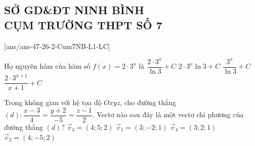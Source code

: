 \subsection*{SỞ GD\&ĐT NINH BÌNH\\CỤM TRƯỜNG THPT SỐ 7}

\caulc
{}[ans/ans-47-26-2-Cum7NB-L1-LC]
\begin{ex}%
	Họ nguyên hàm của hàm số $f(x)=2 \cdot 3^x$ là
	\choice
	{\True $\dfrac{2 \cdot 3^x}{\ln 3}+C$}
	{$2 \cdot 3^x \ln 3+C$}
	{$\dfrac{3^x}{\ln 3}+C$}
	{$\dfrac{2 \cdot 3^{x+1}}{x+1}+C$}
\end{ex}


\begin{ex}%
	Trong không gian với hệ tọa độ $Oxyz$, cho đường thẳng $(d)\colon \dfrac{x-3}{4} = \dfrac{y+2}{-5} = \dfrac{z-1}{2}$. Vectơ nào sau đây là một vectơ chỉ phương của đường thẳng $(d)$?
	\choice
	{$\vec{v}_3 = (4; 5; 2)$}
	{$\vec{v}_1 = (3; -2; 1)$}
	{$\vec{v}_4 = (3; 2; 1)$}
	{\True $\vec{v}_2 = (4; -5; 2)$}
\end{ex}

